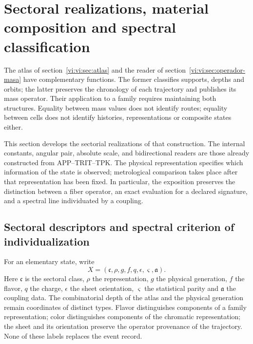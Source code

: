 \section{Sectoral realizations, material composition and spectral classification}
\label{vi:vi:sec:familias-compuestos}

The atlas of section~\ref{vi:vi:sec:atlas} and the reader of
section~\ref{vi:vi:sec:operador-masa} have complementary functions. The
former classifies supports, depths and orbits; the latter preserves the
chronology of each trajectory and publishes its mass operator. Their application
to a family requires maintaining both structures. Equality between
mass values does not identify routes; equality between cells does not
identify histories, representations or composite states either.

This section develops the sectorial realizations of that construction.
The internal constants, angular pair, absolute scale, and bidirectional readers
are those already constructed from APP--TRIT--TPK. The physical representation
specifies which information of the state is observed; metrological comparison
takes place after that representation has been fixed. In particular, the
exposition preserves the distinction between a fiber operator, an exact evaluation
for a declared signature, and a spectral line individuated by a coupling.

\subsection{Sectoral descriptors and spectral criterion of individualization}
\label{vi:vi:subsec:descriptor-familia}

For an elementary state, write
\[
 X=(\mathfrak c,\rho,g,f,q,\epsilon,\varsigma,\mathfrak a).
\]
Here \(\mathfrak c\) is the sectoral class, \(\rho\) the representation,
\(g\) the physical generation, \(f\) the flavor, \(q\) the charge,
\(\epsilon\) the sheet orientation, \(\varsigma\) the statistical parity
and \(\mathfrak a\) the coupling data. The combinatorial depth
of the atlas and the physical generation remain coordinates of distinct
types. Flavor distinguishes components of a family
representation; color distinguishes components of the chromatic representation;
the sheet and its orientation preserve the operator provenance of the
trajectory. None of these labels replaces the event record.

